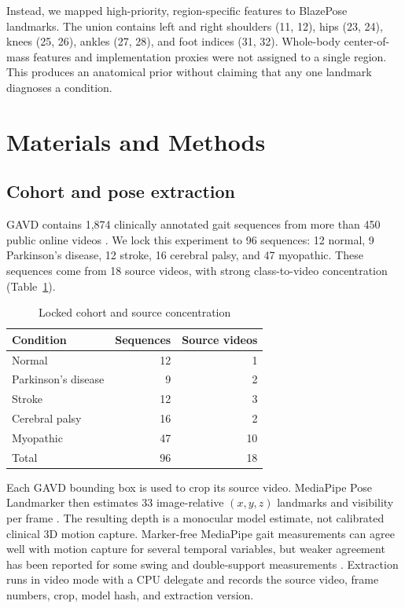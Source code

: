 \documentclass[conference]{IEEEtran}
\begin{document}
Instead, we mapped high-priority, region-specific features to BlazePose landmarks. The union contains left and right shoulders (11, 12), hips (23, 24), knees (25, 26), ankles (27, 28), and foot indices (31, 32). Whole-body center-of-mass features and implementation proxies were not assigned to a single region. This produces an anatomical prior without claiming that any one landmark diagnoses a condition.

\section{Materials and Methods}
\subsection{Cohort and pose extraction}
GAVD contains 1,874 clinically annotated gait sequences from more than 450 public online videos \cite{ranjan2025gavd}. We lock this experiment to 96 sequences: 12 normal, 9 Parkinson's disease, 12 stroke, 16 cerebral palsy, and 47 myopathic. These sequences come from 18 source videos, with strong class-to-video concentration (Table~\ref{tab:cohort}).

\begin{table}[t]
\caption{Locked cohort and source concentration}
\label{tab:cohort}
\centering
\small
\begin{tabular}{lrr}
\toprule
Condition & Sequences & Source videos \\
\midrule
Normal & 12 & 1 \\
Parkinson's disease & 9 & 2 \\
Stroke & 12 & 3 \\
Cerebral palsy & 16 & 2 \\
Myopathic & 47 & 10 \\
\midrule
Total & 96 & 18 \\
\bottomrule
\end{tabular}
\end{table}

Each GAVD bounding box is used to crop its source video. MediaPipe Pose Landmarker then estimates 33 image-relative $(x,y,z)$ landmarks and visibility per frame \cite{grishchenko2022blazepose}. The resulting depth is a monocular model estimate, not calibrated clinical 3D motion capture. Marker-free MediaPipe gait measurements can agree well with motion capture for several temporal variables, but weaker agreement has been reported for some swing and double-support measurements \cite{hii2023markerfree}. Extraction runs in video mode with a CPU delegate and records the source video, frame numbers, crop, model hash, and extraction version.
\end{document}
